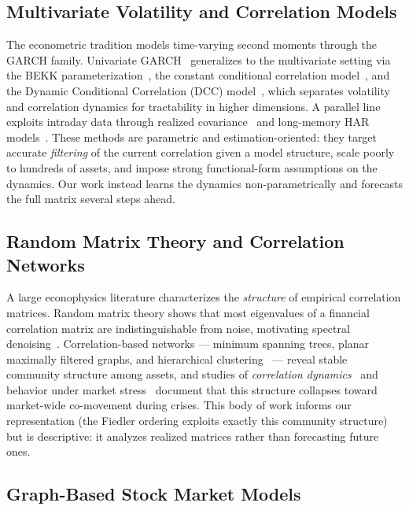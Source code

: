 \documentclass[runningheads]{llncs}
\begin{document}
\subsection{Multivariate Volatility and Correlation Models}

The econometric tradition models time-varying second moments through
the GARCH family. Univariate GARCH~\cite{bollerslev1986generalized}
generalizes to the multivariate setting via the BEKK
parameterization~\cite{engle1995multivariate}, the constant conditional
correlation model~\cite{bollerslev1990modelling}, and the Dynamic
Conditional Correlation (DCC) model~\cite{engle2002dynamic}, which
separates volatility and correlation dynamics for tractability in higher
dimensions. A parallel line exploits intraday data through realized
covariance~\cite{andersen2003modeling} and long-memory HAR
models~\cite{corsi2009simple}. These methods are parametric and
estimation-oriented: they target accurate \emph{filtering} of the
current correlation given a model structure, scale poorly to hundreds of
assets, and impose strong functional-form assumptions on the dynamics.
Our work instead learns the dynamics non-parametrically and forecasts the
full matrix several steps ahead.

\subsection{Random Matrix Theory and Correlation Networks}

A large econophysics literature characterizes the \emph{structure} of
empirical correlation matrices. Random matrix theory shows that most
eigenvalues of a financial correlation matrix are indistinguishable from
noise, motivating spectral denoising~\cite{laloux1999noise,plerou2002random}.
Correlation-based networks --- minimum spanning trees, planar maximally
filtered graphs, and hierarchical
clustering~\cite{mantegni1999hierarchical,tumminello2010correlation,marti2021review}
--- reveal stable community structure among assets, and studies of
\emph{correlation dynamics}~\cite{onnela2003dynamics} and behavior under
market stress~\cite{preis2012quantifying} document that this structure
collapses toward market-wide co-movement during crises. This body of work
informs our representation (the Fiedler ordering exploits exactly this
community structure) but is descriptive: it analyzes realized matrices
rather than forecasting future ones.

\subsection{Graph-Based Stock Market Models}
\end{document}
